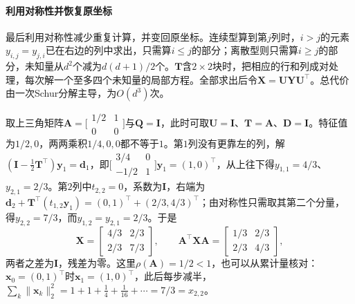 \paragraph{利用对称性并恢复原坐标}
最后利用对称性减少重复计算，并变回原坐标。连续型算到第$j$列时，$i>j$的元素$y_{i,j}=y_{j,i}$已在右边的列中求出，只需算$i\leq j$的部分；离散型则只需算$i\geq j$的部分，未知量从$d^2$个减为$d(d+1)/2$个。$\bm T$含$2\times2$块时，把相应的行和列成对处理，每次解一个至多四个未知量的局部方程。全部求出后令$\bm X=\bm U\bm Y\bm U^\top$。总代价由一次Schur分解主导，为$O(d^3)$次。

\begin{example}[离散型方程的逐列递推]
\label{ex:ls-discrete-lyapunov-recursion}
取上三角矩阵$\bm A=\bigl[\begin{smallmatrix}1/2&1\\0&0\end{smallmatrix}\bigr]$与$\bm Q=\bm I$，此时可取$\bm U=\bm I$、$\bm T=\bm A$、$\bm D=\bm I$。特征值为$1/2,0$，两两乘积$1/4,0,0$都不等于$1$。第$1$列没有更靠左的列，解$(\bm I-\tfrac12\bm T^\top)\bm y_1=\bm d_1$，即$\bigl[\begin{smallmatrix}3/4&0\\-1/2&1\end{smallmatrix}\bigr]\bm y_1=(1,0)^\top$，从上往下得$y_{1,1}=4/3$、$y_{2,1}=2/3$。第$2$列中$t_{2,2}=0$，系数为$\bm I$，右端为$\bm d_2+\bm T^\top(t_{1,2}\bm y_1)=(0,1)^\top+(2/3,4/3)^\top$；由对称性只需取其第二个分量，得$y_{2,2}=7/3$，而$y_{1,2}=y_{2,1}=2/3$。于是
\[
 \bm X=\begin{bmatrix}4/3&2/3\\2/3&7/3\end{bmatrix},\qquad
 \bm A^\top\bm X\bm A=\begin{bmatrix}1/3&2/3\\2/3&4/3\end{bmatrix},
\]
两者之差为$\bm I$，残差为零。这里$\rho(\bm A)=1/2<1$，也可以从累计量核对：$\bm x_0=(0,1)^\top$时$\bm x_1=(1,0)^\top$，此后每步减半，$\sum_k\lVert\bm x_k\rVert_2^2=1+1+\tfrac14+\tfrac1{16}+\cdots=7/3=x_{2,2}$。
\end{example}

